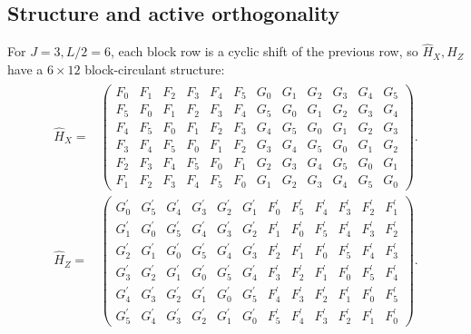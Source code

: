 \documentclass[a4paper,onecolumn,11pt,accepted=2026-08-03]{quantumarticle}
\newcommand{\Hful}{\hat{H}}
\renewcommand\[{\begin{equation}}
\renewcommand\]{\end{equation}}
\theoremstyle{definition}
\begin{document}
\subsection{Structure and active orthogonality}
For $J=3, L/2=6$, each block row is a cyclic shift of the previous row, so $\Hful_X,\Hful_Z$ have a $6\times 12$ block-circulant structure:
\begin{align}
 \begin{aligned} \Hful_X= & \left(\begin{array}{llllll|llllll}
 F_0 & F_1 & F_2 & F_3 & F_4 & F_5 & G_0 & G_1 & G_2 & G_3 & G_4 & G_5 \\
 F_5 & F_0 & F_1 & F_2 & F_3 & F_4 & G_5 & G_0 & G_1 & G_2 & G_3 & G_4 \\
 F_4 & F_5 & F_0 & F_1 & F_2 & F_3 & G_4 & G_5 & G_0 & G_1 & G_2 & G_3 \\\hline 
 F_3 & F_4 & F_5 & F_0 & F_1 & F_2 & G_3 & G_4 & G_5 & G_0 & G_1 & G_2 \\
 F_2 & F_3 & F_4 & F_5 & F_0 & F_1 & G_2 & G_3 & G_4 & G_5 & G_0 & G_1 \\
 F_1 & F_2 & F_3 & F_4 & F_5 & F_0 & G_1 & G_2 & G_3 & G_4 & G_5 & G_0\end{array}\right) .\\
\Hful_Z= & \left(\begin{array}{llllll|llllll}
 G_0^{\prime} & G_5^{\prime} & G_4^{\prime} & G_3^{\prime} & G_2^{\prime} & G_1^{\prime} & F_0^{\prime} & F_5^{\prime} & F_4^{\prime} & F_3^{\prime} & F_2^{\prime} & F_1^{\prime} \\
 G_1^{\prime} & G_0^{\prime} & G_5^{\prime} & G_4^{\prime} & G_3^{\prime} & G_2^{\prime} & F_1^{\prime} & F_0^{\prime} & F_5^{\prime} & F_4^{\prime} & F_3^{\prime} & F_2^{\prime} \\
 G_2^{\prime} & G_1^{\prime} & G_0^{\prime} & G_5^{\prime} & G_4^{\prime} & G_3^{\prime} & F_2^{\prime} & F_1^{\prime} & F_0^{\prime} & F_5^{\prime} & F_4^{\prime} & F_3^{\prime} \\\hline
 G_3^{\prime} & G_2^{\prime} & G_1^{\prime} & G_0^{\prime} & G_5^{\prime} & G_4^{\prime} & F_3^{\prime} & F_2^{\prime} & F_1^{\prime} & F_0^{\prime} & F_5^{\prime} & F_4^{\prime} \\
 G_4^{\prime} & G_3^{\prime} & G_2^{\prime} & G_1^{\prime} & G_0^{\prime} & G_5^{\prime} & F_4^{\prime} & F_3^{\prime} & F_2^{\prime} & F_1^{\prime} & F_0^{\prime} & F_5^{\prime} \\
 G_5^{\prime} & G_4^{\prime} & G_3^{\prime} & G_2^{\prime} & G_1^{\prime} & G_0^{\prime} & F_5^{\prime} & F_4^{\prime} & F_3^{\prime} & F_2^{\prime} & F_1^{\prime} & F_0^{\prime}
\end{array}\right) .\end{aligned}
\end{align}
\end{document}

